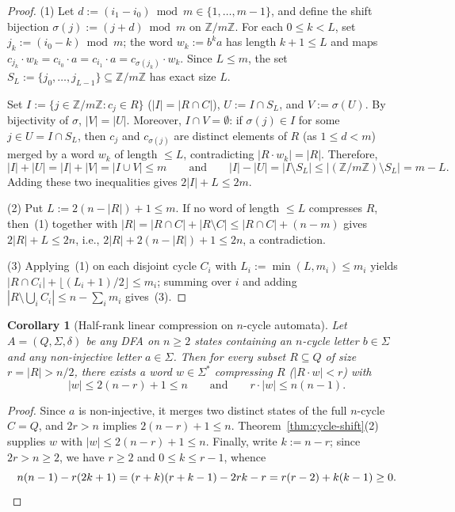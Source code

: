 \documentclass[11pt,a4paper]{article}
\newtheorem{corollary}[theorem]{Corollary}
\theoremstyle{definition}
\theoremstyle{remark}
\begin{document}
\begin{proof}
(1) Let $d := (i_1 - i_0) \bmod m \in \{1, \dots, m - 1\}$, and define the shift bijection $\sigma(j) := (j + d) \bmod m$ on $\mathbb{Z}/m\mathbb{Z}$. For each $0 \le k < L$, set $j_k := (i_0 - k) \bmod m$; the word $w_k := b^k a$ has length $k + 1 \le L$ and maps $c_{j_k} \cdot w_k = c_{i_0} \cdot a = c_{i_1} \cdot a = c_{\sigma(j_k)} \cdot w_k$. Since $L \le m$, the set $S_L := \{j_0, \dots, j_{L - 1}\} \subseteq \mathbb{Z}/m\mathbb{Z}$ has exact size $L$.

Set $I := \{j \in \mathbb{Z}/m\mathbb{Z} : c_j \in R\}$ ($|I| = |R \cap C|$), $U := I \cap S_L$, and $V := \sigma(U)$. By bijectivity of $\sigma$, $|V| = |U|$. Moreover, $I \cap V = \emptyset$: if $\sigma(j) \in I$ for some $j \in U = I \cap S_L$, then $c_j$ and $c_{\sigma(j)}$ are distinct elements of $R$ (as $1 \le d < m$) merged by a word $w_k$ of length $\le L$, contradicting $|R \cdot w_k| = |R|$. Therefore,
\[
  |I| + |U| = |I| + |V| = |I \cup V| \le m
  \qquad\text{and}\qquad
  |I| - |U| = |I \setminus S_L| \le |(\mathbb{Z}/m\mathbb{Z}) \setminus S_L| = m - L.
\]
Adding these two inequalities gives $2|I| + L \le 2m$.

(2) Put $L := 2(n - |R|) + 1 \le m$. If no word of length $\le L$ compresses $R$, then~(1) together with $|R| = |R \cap C| + |R \setminus C| \le |R \cap C| + (n - m)$ gives $2|R| + L \le 2n$, i.e., $2|R| + 2(n - |R|) + 1 \le 2n$, a contradiction.

(3) Applying~(1) on each disjoint cycle $C_i$ with $L_i := \min(L, m_i) \le m_i$ yields $|R \cap C_i| + \lfloor (L_i + 1) / 2 \rfloor \le m_i$; summing over $i$ and adding $|R \setminus \bigcup_i C_i| \le n - \sum_i m_i$ gives~(3).
\end{proof}

\begin{corollary}[Half-rank linear compression on $n$-cycle automata]\label{cor:ncycle-half}
Let $A = (Q, \Sigma, \delta)$ be any DFA on $n \ge 2$ states containing an $n$-cycle letter $b \in \Sigma$ and any non-injective letter $a \in \Sigma$. Then for every subset $R \subseteq Q$ of size $r = |R| > n / 2$, there exists a word $w \in \Sigma^*$ compressing $R$ ($|R \cdot w| < r$) with
\[
  |w| \le 2(n - r) + 1 \le n \qquad\text{and}\qquad r \cdot |w| \le n(n - 1).
\]
\end{corollary}

\begin{proof}
Since $a$ is non-injective, it merges two distinct states of the full $n$-cycle $C = Q$, and $2r > n$ implies $2(n - r) + 1 \le n$. Theorem~\ref{thm:cycle-shift}(2) supplies $w$ with $|w| \le 2(n - r) + 1 \le n$. Finally, write $k := n - r$; since $2r > n \ge 2$, we have $r \ge 2$ and $0 \le k \le r - 1$, whence
\[
  n(n - 1) - r(2k + 1) = (r + k)(r + k - 1) - 2rk - r = r(r - 2) + k(k - 1) \ge 0. \qedhere
\]
\end{proof}
\end{document}
